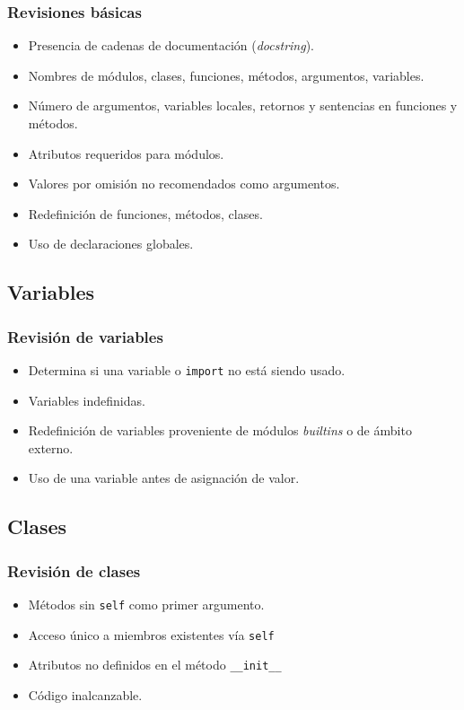 \documentclass{beamer}
\begin{document}
\begin{frame}
    \frametitle{Revisiones básicas}

    \begin{itemize}
          \item Presencia de cadenas de documentación (\emph{docstring}).
          \item Nombres de módulos, clases, funciones, métodos, argumentos, variables.
          \item Número de argumentos, variables locales, retornos y sentencias en funciones y métodos.
          \item Atributos requeridos para módulos.
          \item Valores por omisión no recomendados como argumentos.
          \item Redefinición de funciones, métodos, clases.
          \item Uso de declaraciones globales.
    \end{itemize}
\end{frame}

\subsection{Variables}

\begin{frame}
    \frametitle{Revisión de variables}

    \begin{itemize}
          \item Determina si una variable o \texttt{import} no está siendo usado.
          \item Variables indefinidas.
          \item Redefinición de variables proveniente de módulos \emph{builtins} o de ámbito externo.
          \item Uso de una variable antes de asignación de valor.
    \end{itemize}
\end{frame}

\subsection{Clases}

\begin{frame}
    \frametitle{Revisión de clases}

    \begin{itemize}
          \item Métodos sin \texttt{self} como primer argumento.
          \item Acceso único a miembros existentes vía \texttt{self}
          \item Atributos no definidos en el método \texttt{\_\_init\_\_}
          \item Código inalcanzable.
    \end{itemize}
\end{frame}
\end{document}
